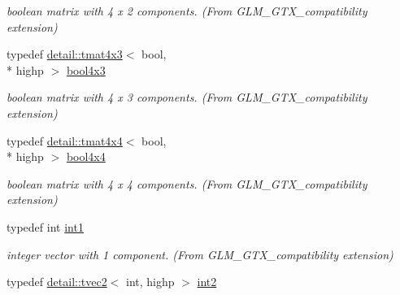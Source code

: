 \begin{DoxyCompactItemize}
\begin{DoxyCompactList}\small\item\em boolean matrix with 4 x 2 components. (From G\-L\-M\-\_\-\-G\-T\-X\-\_\-compatibility extension) \end{DoxyCompactList}\item 
\hypertarget{group__gtx__compatibility_ga7acb207ab877c53dc5751752e1f70053}{typedef \hyperlink{structglm_1_1detail_1_1tmat4x3}{detail\-::tmat4x3}$<$ bool, \\*
highp $>$ \hyperlink{group__gtx__compatibility_ga7acb207ab877c53dc5751752e1f70053}{bool4x3}}\label{group__gtx__compatibility_ga7acb207ab877c53dc5751752e1f70053}

\begin{DoxyCompactList}\small\item\em boolean matrix with 4 x 3 components. (From G\-L\-M\-\_\-\-G\-T\-X\-\_\-compatibility extension) \end{DoxyCompactList}\item 
\hypertarget{group__gtx__compatibility_ga4738dad3625bfa64ddf218897da020e9}{typedef \hyperlink{structglm_1_1detail_1_1tmat4x4}{detail\-::tmat4x4}$<$ bool, \\*
highp $>$ \hyperlink{group__gtx__compatibility_ga4738dad3625bfa64ddf218897da020e9}{bool4x4}}\label{group__gtx__compatibility_ga4738dad3625bfa64ddf218897da020e9}

\begin{DoxyCompactList}\small\item\em boolean matrix with 4 x 4 components. (From G\-L\-M\-\_\-\-G\-T\-X\-\_\-compatibility extension) \end{DoxyCompactList}\item 
\hypertarget{group__gtx__compatibility_gaba41d7803e4b24c17656d74377b88286}{typedef int \hyperlink{group__gtx__compatibility_gaba41d7803e4b24c17656d74377b88286}{int1}}\label{group__gtx__compatibility_gaba41d7803e4b24c17656d74377b88286}

\begin{DoxyCompactList}\small\item\em integer vector with 1 component. (From G\-L\-M\-\_\-\-G\-T\-X\-\_\-compatibility extension) \end{DoxyCompactList}\item 
\hypertarget{group__gtx__compatibility_ga3f999377257cbda84c745b688ddcba81}{typedef \hyperlink{structglm_1_1detail_1_1tvec2}{detail\-::tvec2}$<$ int, highp $>$ \hyperlink{group__gtx__compatibility_ga3f999377257cbda84c745b688ddcba81}{int2}}\label{group__gtx__compatibility_ga3f999377257cbda84c745b688ddcba81}


\end{DoxyCompactItemize}
